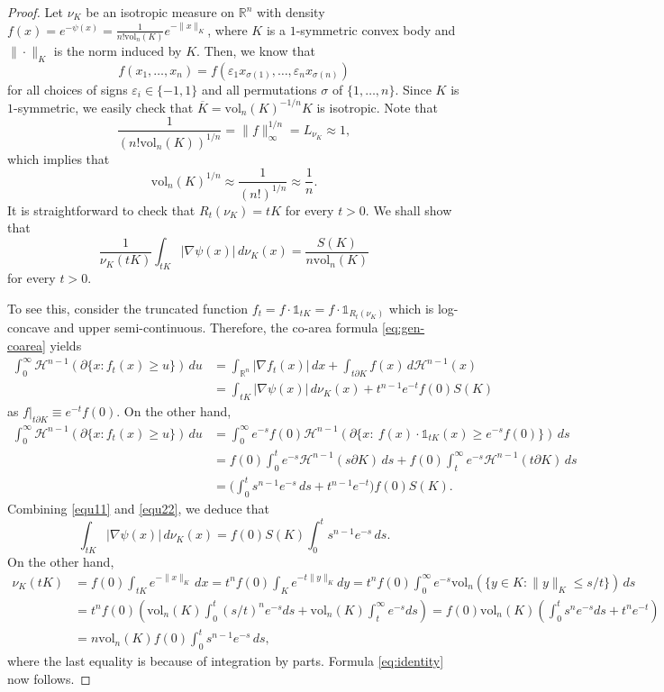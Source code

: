 \documentclass[10pt,a4paper]{amsart}
\newcommand{\R}{\mathbb{R}}
\newcommand{\gr}{\geqslant}
\newcommand{\ls}{\leqslant}
\newcommand{\vol}{\mathrm{vol}}
\renewcommand{\epsilon}{\varepsilon}
\begin{document}
\begin{proof}Let $\nu_K$ be an isotropic measure on $\mathbb{R}^n$ with density $f(x)=e^{-\psi(x)}=\frac{1}{n!\vol_n(K)}e^{-\|x\|_K}$, where $K$ is a $1$-symmetric convex body
and $\|\cdot\|_K$ is the norm induced by $K$. Then, we know that
$$f(x_1,\ldots,x_n)=f(\epsilon_1 x_{\sigma(1)},\ldots,\epsilon_n x_{\sigma(n)})$$ 
for all choices of signs $\epsilon_i\in\{-1,1\}$ and all permutations $\sigma$ of $\{1,\ldots,n\}$. 
Since $K$ is $1$-symmetric, we easily check that $\overline{K}=\vol_n(K)^{-1/n}K$ is isotropic.
Note that 
$$\frac{1}{\left(n!\vol_n(K)\right)^{1/n}}=\|f\|_{\infty}^{1/n}=L_{\nu_K}\approx 1,$$
which implies that
$$\vol_n(K)^{1/n}\approx \frac{1}{(n!)^{1/n}}\approx \frac{1}{n}.$$
It is straightforward to check that $R_t(\nu_K)=tK$ for every $t>0$. We shall show that
\begin{equation}\label{eq:identity}\frac{1}{\nu_K(tK)}\int_{tK}|\nabla \psi(x)|\,d\nu_K(x) =\frac{S(K)}{n\vol_n(K)}\end{equation}
for every $t>0$.

To see this, consider the truncated function $f_t = f \cdot \mathds{1}_{tK} = f\cdot  \mathds{1}_{R_t(\nu_K)}$ which is log-concave and upper semi-continuous. Therefore, the co-area formula \eqref{eq:gen-coarea} yields
\begin{align} \label{equ11}
\int_0^\infty \mathcal{H}^{n-1} (\partial\{x: f_t(x)\gr u\})\, du & = \int_{\R^n} |\nabla f_t(x)| \, d x + \int_{t\partial K} f(x)\, d\mathcal{H}^{n-1}(x)\\ 
\nonumber & = \int_{tK} |\nabla \psi(x)|\, d\nu_K(x) + t^{n-1} e^{-t}f(0)S(K)
\end{align}
as $f|_{t\partial K} \equiv e^{-t}f(0)$. On the other hand,
\begin{align} \label{equ22}
\int_0^\infty \mathcal{H}^{n-1}  (\partial\{x: f_t(x)\gr u\})\, du & = \int_0^\infty e^{-s} f(0) \mathcal{H}^{n-1}(\partial\{x: \ f(x)  \cdot \mathds{1}_{tK}(x) \gr e^{-s} f(0)\})\, ds\\ 
\nonumber & = f(0) \int_0^t e^{-s} \mathcal{H}^{n-1}(s\partial K)\, ds + f(0)\int_t^\infty e^{-s} \mathcal{H}^{n-1}(t\partial K) \, ds\\ 
\nonumber & = \bigg(\int_0^t s^{n-1} e^{-s}\, ds + t^{n-1} e^{-t}\bigg) f(0)S(K).
\end{align}
Combining \eqref{equ11} and \eqref{equ22}, we deduce that
\begin{equation}
\int_{tK} |\nabla \psi(x)|\, d\nu_K(x) = f(0) S(K) \int_0^t s^{n-1} e^{-s} \, ds.
\end{equation}
On the other hand,
\begin{align*}
\nu_K(tK) & = f(0) \int_{tK} e^{-\|x\|_K}\, dx =t^n f(0)\int_Ke^{-t\|y\|_K}dy
=t^n f(0) \int_0^{\infty}e^{-s}\vol_n(\{y\in K:\|y\|_K\ls s/t\})\,ds\\
&=t^n f(0)\left(\vol_n(K)\int_0^t(s/t)^ne^{-s}ds+\vol_n(K)\int_t^{\infty}e^{-s}ds\right) =f(0) \vol_n(K) \left(\int_0^ts^ne^{-s}ds+t^ne^{-t}\right)\\ 
& = n \vol_n(K) f(0) \int_0^t s^{n-1} e^{-s}\, ds,
\end{align*}
where the last equality is because of integration by parts. Formula \eqref{eq:identity} now follows.


\end{proof}
\end{document}
